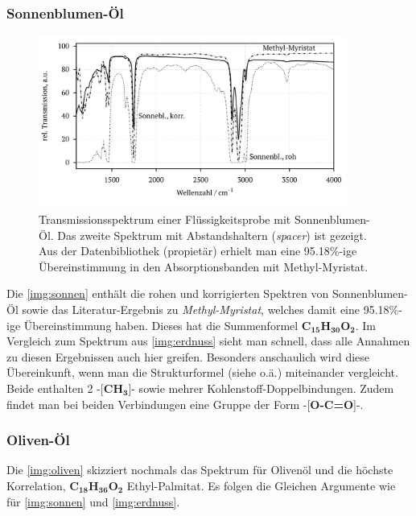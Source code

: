 \documentclass[a4paper,10pt,twocolumn]{article}
\newcommand{\tilt}[1]{\textit{#1}}
\newcommand{\fett}[1]{\textbf{#1}}
\begin{document}
		\subsubsection*{Sonnenblumen-\"Ol}
		
			\begin{figure}
			\centering
				\includegraphics[width=0.9\textwidth]{Gruppe2A/sonnen.pdf}
				\caption{Transmissionsspektrum einer Fl\"ussigkeitsprobe mit Sonnenblumen-\"Ol. Das zweite Spektrum mit Abstandshaltern (\tilt{spacer}) ist gezeigt. Aus der Datenbibliothek (propiet\"ar) erhielt man eine 95.18\%-ige \"Ubereinstimmung in den Absorptionsbanden mit Methyl-Myristat.} 
				\label{img:sonnen}
			\end{figure}
		
		Die \autoref{img:sonnen} enth\"alt die rohen und korrigierten Spektren von Sonnenblumen-\"Ol sowie das Literatur-Ergebnis zu \tilt{Methyl-Myristat}, welches damit eine 95.18\%-ige \"Ubereinstimmung haben. Dieses hat die Summenformel \fett{C}$_{\fett{15}}$\fett{H}$_{\fett{30}}$\fett{O}$_{\fett{2}}$. Im Vergleich zum Spektrum aus \autoref{img:erdnuss} sieht man schnell, dass alle Annahmen zu diesen Ergebnissen auch hier greifen. Besonders anschaulich wird diese \"Ubereinkunft, wenn man die Strukturformel (siehe \cite{FTIRStruk} o.\"a.) miteinander vergleicht. Beide enthalten 2 -[\fett{CH}$_{\fett{3}}$]- sowie mehrer Kohlenstoff-Doppelbindungen. Zudem findet man bei beiden Verbindungen eine Gruppe der Form -[\fett{O-C=O}]-.
		
		\subsubsection*{Oliven-\"Ol}

		Die \autoref{img:oliven} skizziert nochmals das Spektrum f\"ur Oliven\"ol und die h\"ochste Korrelation, \fett{C}$_{\fett{18}}$\fett{H}$_{\fett{36}}$\fett{O}$_{\fett{2}}$ Ethyl-Palmitat. Es folgen die Gleichen Argumente wie f\"ur \autoref{img:sonnen} und \autoref{img:erdnuss}.
\end{document}
